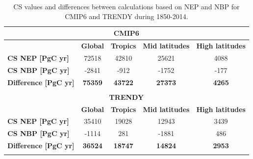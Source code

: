 \documentclass[10pt]{article}
\begin{document}
\begin{table}
\label{Table:CSdiff_NEP_NBPmodels}
\caption{CS values and differences between calculations based on NEP and NBP for CMIP6 and TRENDY during 1850-2014.}
\centering
\begin{tabular}{lcccc}
\hline
\multicolumn{5}{c}{\textbf{CMIP6}}                                                                                       \\ \hline
\textbf{}                         & \textbf{Global}      & \textbf{Tropics}     & \textbf{Mid latitudes} & \textbf{High latitudes} \\
\textbf{CS NEP {[}PgC yr{]}}      & 72518              & 42810              & 25621                & 4088                 \\
\textbf{CS NBP {[}PgC yr{]}}      & -2841             & -912             & -1752               & -177               \\ \hline
\textbf{Difference  {[}PgC yr{]}} & \textbf{75359}     & \textbf{43722}     & \textbf{27373}       & \textbf{4265}        \\ \hline
                                  & \multicolumn{1}{l}{} & \multicolumn{1}{l}{} & \multicolumn{1}{l}{}   & \multicolumn{1}{l}{}    \\ \hline
\multicolumn{5}{c}{\textbf{TRENDY}}                                                                                       \\ \hline
\textbf{}                         & \textbf{Global}      & \textbf{Tropics}     & \textbf{Mid latitudes} & \textbf{High latitudes} \\
\textbf{CS NEP {[}PgC yr{]}}      & 35410               & 19028               & 12943                 & 3439                   \\
\textbf{CS NBP {[}PgC yr{]}}      & -1114               & 281                & -1881                  & 486                   \\ \hline
\textbf{Difference  {[}PgC yr{]}} & \textbf{36524}      & \textbf{18747}      & \textbf{14824}        & \textbf{2953}          \\ \hline
                                  & \multicolumn{1}{l}{} & \multicolumn{1}{l}{} & \multicolumn{1}{l}{}   & \multicolumn{1}{l}{}    \\
\end{tabular}
\end{table}
  
\end{document}

